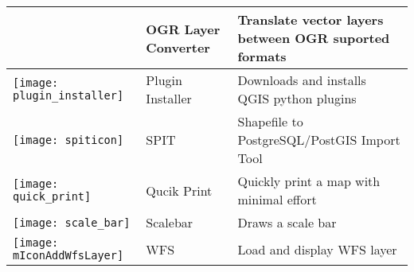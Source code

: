 \begin{minipage}{\textwidth}
\begin{table}[H]
\begin{tabular}{|l|l|p{4in}|}
 & OGR Layer Converter \index{plugins!OGR converter} & Translate vector
layers between OGR suported formats\\
\hline
\texttt{[image: plugin\_installer]}
 & Plugin Installer \index{plugins!Plugin Installer} & Downloads and installs
QGIS python plugins\\
\hline
\texttt{[image: spiticon]}
 & SPIT \index{plugins!spit}& Shapefile to PostgreSQL/PostGIS Import Tool \\
\hline
\texttt{[image: quick\_print]}
 & Qucik Print \index{plugins!quick print}& Quickly print a map with minimal
effort \\
\hline
\texttt{[image: scale\_bar]}
 & Scalebar \index{plugins!scalebar}& Draws a scale bar\\
\hline
\texttt{[image: mIconAddWfsLayer]}
 & WFS & Load and display WFS layer \\
\hline
\end{tabular}
\end{table}
\end{minipage}

\normalsize

\begin{Tip}\caption{\textsc{Plugins Settings Saved to Project}}
\end{Tip}
